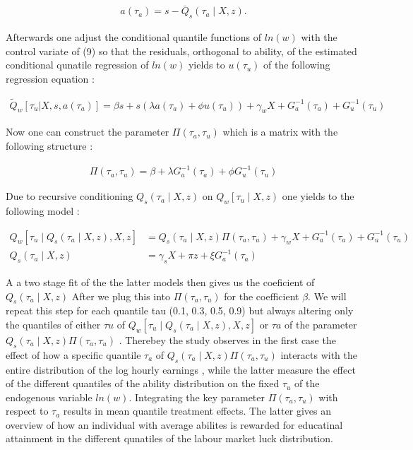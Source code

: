 \documentclass[12pt,a4paper]{article}
\begin{document}
\begin{align}a\left(\tau_{a}\right)=s-\bar{Q}_{s}\left(\tau_{a}\mid X,z\right).\end{align}

Afterwards one adjust the conditional quantile functions of \(ln(w)\)
with the control variate of (9) so that the residuals, orthogonal to
ability, of the estimated conditional qunatile regression of \(ln(w)\)
yields to \(u(\tau_u)\) of the following regression equation :

\begin{align}
\tilde{Q}_w[\tau_u|X, s, a(\tau_a)] = \beta s + s(\lambda a(\tau_a) + \phi u(\tau_u)) + \gamma_w X + G_{a}^{-1}\left(\tau_{a}\right) + G_{u}^{-1}\left(\tau_{u}\right)
\end{align}

Now one can construct the parameter \(\Pi(\tau_a,\tau_u)\) which is a
matrix with the following structure :

\begin{align} \Pi\left(\tau_{a},
 \tau_{u}\right)=\beta+\lambda G_{a}^{-1}\left(\tau_{a}\right)+\phi
 G_{u}^{-1}\left(\tau_{u}\right)
 \end{align}

Due to recursive conditioning \(Q_{s}\left(\tau_{a}\mid X,z\right)\) on
\(Q_{w}\left[\tau_{u}\mid X,z\right)\) one yields to the following model
:

\begin{align} Q_{w}\left[\tau_{u}
 \mid Q_s\left(\tau_{a} \mid X, z\right), X, z\right]&=Q_s\left(\tau_{a}
 \mid X, z\right) \Pi\left(\tau_{a}, \tau_{u}\right)+\gamma_{w}
 X+G_{a}^{-1}\left(\tau_{a}\right)+G_{u}^{-1}\left(\tau_{u}\right)&  \\
 Q_{s}\left(\tau_{a} \mid X, z\right)&=\gamma_{s} X+\pi z+\xi
 G_{a}^{-1}\left(\tau_{a}\right) & 
 \end{align}

A a two stage fit of the the latter models then gives us the coeficient
of \(Q_s\left(\tau_{a}\mid X, z\right)\) After we plug this into
\(\Pi\left(\tau_{a},\tau_{u}\right)\) for the coefficient \(\beta\). We
will repeat this step for each quantile tau (0.1, 0.3, 0.5, 0.9) but
always altering only the quantiles of either \(\tau{u}\) of
\(Q_{w}\left[\tau_{u}\mid Q_s\left(\tau_{a} \mid X, z\right), X, z\right]\)
or \(\tau{a}\) of the parameter
\(Q_s\left(\tau_{a}\mid X, z\right) \Pi\left(\tau_{a}, \tau_{u}\right)\)
. Therebey the study observes in the first case the effect of how a
specific quantile \(\tau_a\) of
\(Q_s\left(\tau_{a}\mid X, z\right)\Pi\left(\tau_{a},\tau_{u}\right)\)
interacts with the entire distribution of the log hourly earnings ,
while the latter measure the effect of the different quantiles of the
ability distribution on the fixed \(\tau_u\) of the endogenous variable
\(ln(w)\). Integrating the key parameter
\(\Pi\left(\tau_{a},\tau_{u}\right)\) with respect to \(\tau_a\) results
in mean quantile treatment effects. The latter gives an overview of how
an individual with average abilites is rewarded for educatinal
attainment in the different qunatiles of the labour market luck
distribution.
\end{document}
